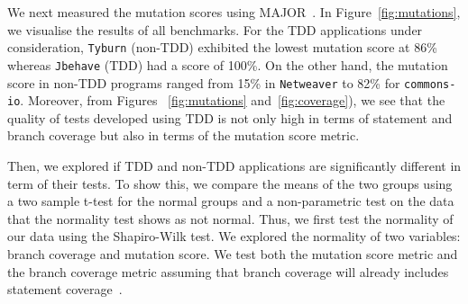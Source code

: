 \documentclass[conference]{IEEEtran}
\begin{document}
We next measured the mutation scores using MAJOR~\cite{just2012redundant, just2012usingnon-redundant, just2011major}. In Figure~\ref{fig:mutations}, we visualise the results of all benchmarks. %
For the TDD applications under consideration,  \texttt{Tyburn} (non-TDD) exhibited the lowest mutation score at 86\% whereas  \texttt{Jbehave} (TDD) had a score of 100\%. On the other hand, the mutation score in non-TDD programs ranged from 15\% in \texttt{Netweaver} to 82\% for \texttt{commons-io}. Moreover, from Figures~ \ref{fig:mutations} and~\ref{fig:coverage}), we see that the quality of tests developed using TDD is not only high in terms of statement and branch coverage but also in terms of the mutation score metric.  

Then, we explored if TDD and non-TDD applications %
are significantly different in term of their tests. %
To show this, we compare the means of the two groups using a two sample t-test for the normal groups and a non-parametric test on the data that the normality test shows as not normal. Thus, we first test the normality of our data using the Shapiro-Wilk test. %
We explored the normality of two variables: branch coverage and mutation score. We test both the mutation score metric and the branch coverage metric assuming that branch coverage will already includes statement coverage~\cite{steve2011Code}.  
\end{document}
